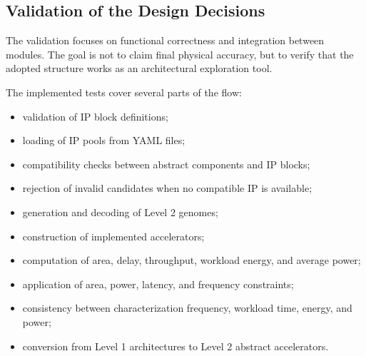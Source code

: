 \subsection{Validation of the Design Decisions}
The validation focuses on functional correctness and integration
between modules. The goal is not to claim final physical accuracy,
but to verify that the adopted structure works as an architectural
exploration tool.

The implemented tests cover several parts of the flow:

\begin{itemize}
\item validation of IP block definitions;
\item loading of IP pools from YAML files;
\item compatibility checks between abstract components and IP blocks;
\item rejection of invalid candidates when no compatible IP is
available;
\item generation and decoding of Level 2 genomes;
\item construction of implemented accelerators;
\item computation of area, delay, throughput, workload energy, and
average power;
\item application of area, power, latency, and frequency constraints;
\item consistency between characterization frequency, workload time,
energy, and power;
\item conversion from Level 1 architectures to Level 2 abstract
accelerators.
\end{itemize}

